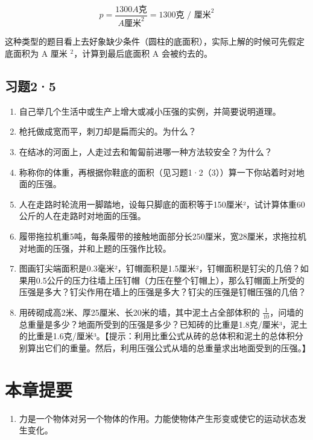 \[
p = \frac {1300 A \text{克}}{A \text{厘米} ^ {2}} = 1300 \text{克 / 厘米} ^ {2}
\]

这种类型的题目看上去好象缺少条件（圆柱的底面积），实际上解的时候可先假定底面积为
A 厘米 \(^{2}\)，计算到最后底面积 A 会被约去的。

\subsection{习题2·5}\label{ux4e60ux989825}

\begin{enumerate}
\def\labelenumi{\arabic{enumi}.}
\item
  自己举几个生活中或生产上增大或减小压强的实例，并简要说明道理。
\item
  枪托做成宽而平，刺刀却是扁而尖的。为什么？
\item
  在结冰的河面上，人走过去和匍匐前进哪一种方法较安全？为什么？
\item
  称称你的体重，再根据你鞋底的面积（见习题1·2（3））算一下你站着时对地面的压强。
\item
  人在走路时轮流用一脚踏地，设每只脚底的面积等于150厘米²，试计算体重60公斤的人在走路时对地面的压强。
\item
  履带拖拉机重5吨，每条履带的接触地面部分长250厘米，宽28厘米，求拖拉机对地面的压强，并和上题的压强作比较。
\item
  图画钉尖端面积是0.3毫米²，钉帽面积是1.5厘米²，钉帽面积是钉尖的几倍？如果用0.5公斤的压力往墙上压钉帽（力压在整个钉帽上），那么钉帽面上所受的压强是多大？钉尖作用在墙上的压强是多大？钉尖的压强是钉帽压强的几倍？
\item
  用砖砌成高2米、厚25厘米、长20米的墙，其中泥土占全部体积的
  \(\frac{1}{10}\)，问墙的总重量是多少？地面所受到的压强是多少？已知砖的比重是1.8克/厘米³，泥土的比重是1.6克/厘米³。【提示：利用比重公式从砖的总体积和泥土的总体积分别算出它们的重量。然后，利用压强公式从墙的总重量求出地面受到的压强。】
\end{enumerate}

\section{本章提要}\label{ux672cux7ae0ux63d0ux8981-1}

\begin{enumerate}
\def\labelenumi{\arabic{enumi}.}
\tightlist
\item
  力是一个物体对另一个物体的作用。力能使物体产生形变或使它的运动状态发生变化。
\end{enumerate}

